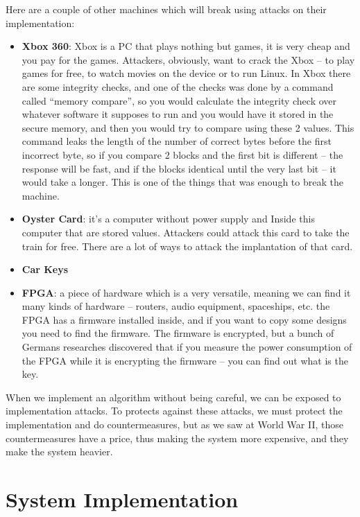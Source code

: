 Here are a couple of other machines which will break using attacks on their implementation:

\begin{itemize}
\item \textbf{Xbox 360}:  Xbox is a PC that plays nothing but games, it is very cheap and you pay for the games. Attackers, obviously, want to crack the Xbox – to play games for free, to watch movies on the device or to run Linux. In Xbox there are some integrity checks, and one of the checks was done by a command called “memory compare”\cite{memcmp}, so you would calculate the integrity check over whatever software it supposes to run and you would have it stored in the secure memory, and then you would try to compare using these 2 values. This command leaks the length of the number of correct bytes before the first incorrect byte, so if you compare 2 blocks and the first bit is different – the response will be fast, and if the blocks identical until the very last bit – it would take a longer. This is one of the things that was enough to break the machine. 
\item \textbf{Oyster Card}: it’s a computer without power supply and Inside this computer that are stored values. Attackers could attack this card to take the train for free. There are a lot of ways to attack the implantation of that card. \cite{garcia2008dismantling, courtois2008algebraic}
\item \textbf{Car Keys}\cite{relayAttack}
\item \textbf{FPGA}\cite{fpga}: a piece of hardware which is a very versatile, meaning we can find it many kinds of hardware – routers, audio equipment, spaceships, etc. the FPGA has a firmware installed inside, and if you want to copy some designs you need to find the firmware. The firmware is encrypted, but a bunch of Germans researches discovered\cite{moradi2011vulnerability} that if you measure the power consumption of the FPGA while it is encrypting the firmware – you can find out what is the key.
\end{itemize}

When we implement an algorithm without being careful, we can be exposed to implementation attacks. To protects against these attacks, we must protect the implementation and do countermeasures, but as we saw at World War II, those countermeasures have a price, thus making the system more expensive, and they make the system heavier.

\section{System Implementation}
\label{sec:SystemImpl}

